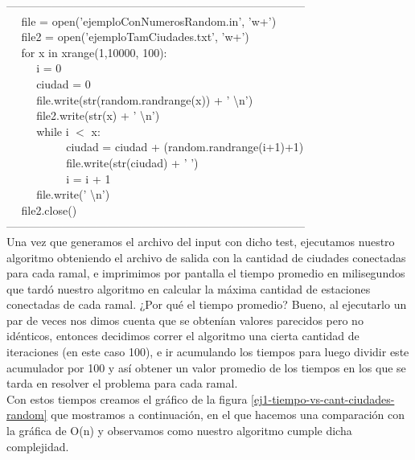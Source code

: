 --------------------------------------------------------------------------------\\
$~~~~~~$file = open('ejemploConNumerosRandom.in', 'w+')\\
$~~~~~~$file2 = open('ejemploTamCiudades.txt', 'w+')\\
$~~~~~~$for x in xrange(1,10000, 100):\\
$~~~~~~~~~~~~$i = 0\\
$~~~~~~~~~~~~$ciudad = 0\\
$~~~~~~~~~~~~$file.write(str(random.randrange(x)) + ' \textbackslash n')\\
$~~~~~~~~~~~~$file2.write(str(x) + ' \textbackslash n')\\
$~~~~~~~~~~~~$while i $<$ x:\\
$~~~~~~~~~~~~~~~~~~~~~~~~$ciudad = ciudad + (random.randrange(i+1)+1)\\
$~~~~~~~~~~~~~~~~~~~~~~~~$file.write(str(ciudad) + ' ')\\
$~~~~~~~~~~~~~~~~~~~~~~~~$i = i + 1\\
$~~~~~~~~~~~~$file.write(' \textbackslash n')\\
$~~~~~~$file2.close()\\

--------------------------------------------------------------------------------\\

Una vez que generamos el archivo del input con dicho test, ejecutamos nuestro algoritmo obteniendo el archivo de salida con la cantidad de ciudades conectadas para cada ramal, e imprimimos por pantalla el tiempo promedio en milisegundos que tardó nuestro algoritmo en calcular la máxima cantidad de estaciones conectadas de cada ramal. ¿Por qué el tiempo promedio? Bueno, al ejecutarlo un par de veces nos dimos cuenta que se obtenían valores parecidos pero no idénticos, entonces decidimos correr el algoritmo una cierta cantidad de iteraciones (en este caso 100), e ir acumulando los tiempos para luego dividir este acumulador por 100 y así obtener un valor promedio de los tiempos en los que se tarda en resolver el problema para cada ramal. \\

Con estos tiempos creamos el gráfico de la figura \ref{ej1-tiempo-vs-cant-ciudades-random} que mostramos a continuación, en el que hacemos una comparación con la gráfica de O(n) y observamos como nuestro algoritmo cumple dicha complejidad.


